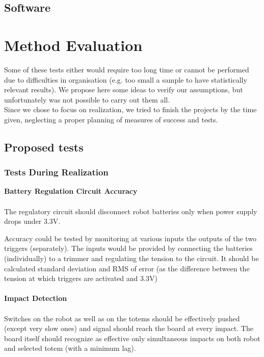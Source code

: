 \documentclass[a4paper,twoside]{book}
\newcommand{\includeDir}{include}
\begin{document}
\section{Software}
\label{sec:software}


\chapter{Method Evaluation}

Some of these tests either would require too long time or cannot be performed due to difficulties in organisation (e.g. too small a sample to have statistically relevant results). We propose here some ideas to verify our assumptions, but unfortunately was not possible to carry out them all.
\\
Since we chose to focus on realization, we tried to finish the projects by the time given, neglecting a proper planning of measures of success and tests.
\\
\section{Proposed tests}

\subsection{Tests During Realization}

\textbf{Battery Regulation Circuit Accuracy}
\\
\\
The regulatory circuit should disconnect robot batteries only when power supply drops under 3.3V.

Accuracy could be tested by monitoring at various inputs the outputs of the two triggers (separately). The inputs would be provided by connecting the batteries (individually) to a trimmer and regulating the tension to the circuit. It should be calculated standard deviation and RMS of error (as the difference between the tension at which triggers are activated and 3.3V)
\\
\\
\textbf{Impact Detection}
\\
\\
Switches on the robot as well as on the totems should be effectively pushed (except very slow ones) and signal should reach the board at every impact.
The board itself should recognize as effective only simultaneous impacts on both robot and selected totem (with a minimum lag).
\end{document}
